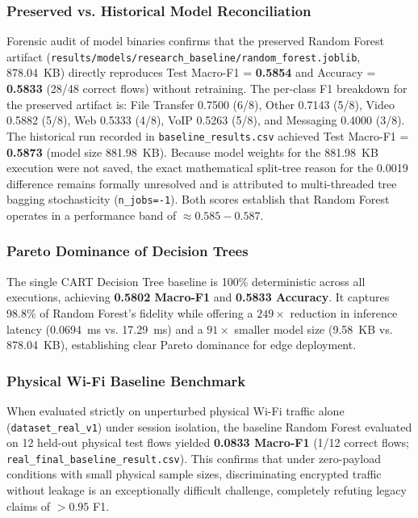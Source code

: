 \documentclass[conference]{IEEEtran}
\begin{document}
\subsubsection{Preserved vs. Historical Model Reconciliation}
Forensic audit of model binaries confirms that the preserved Random Forest artifact (\texttt{results/models/research\_baseline/random\_forest.joblib}, 878.04~KB) directly reproduces Test Macro-F1 = \textbf{0.5854} and Accuracy = \textbf{0.5833} (28/48 correct flows) without retraining. The per-class F1 breakdown for the preserved artifact is: File Transfer 0.7500 (6/8), Other 0.7143 (5/8), Video 0.5882 (5/8), Web 0.5333 (4/8), VoIP 0.5263 (5/8), and Messaging 0.4000 (3/8). The historical run recorded in \texttt{baseline\_results.csv} achieved Test Macro-F1 = \textbf{0.5873} (model size 881.98~KB). Because model weights for the 881.98~KB execution were not saved, the exact mathematical split-tree reason for the 0.0019 difference remains formally unresolved and is attributed to multi-threaded tree bagging stochasticity (\texttt{n\_jobs=-1}). Both scores establish that Random Forest operates in a performance band of $\approx 0.585 - 0.587$.

\subsubsection{Pareto Dominance of Decision Trees}
The single CART Decision Tree baseline is 100\% deterministic across all executions, achieving \textbf{0.5802 Macro-F1} and \textbf{0.5833 Accuracy}. It captures 98.8\% of Random Forest's fidelity while offering a $249\times$ reduction in inference latency (0.0694~ms vs. 17.29~ms) and a $91\times$ smaller model size (9.58~KB vs. 878.04~KB), establishing clear Pareto dominance for edge deployment.

\subsubsection{Physical Wi-Fi Baseline Benchmark}
When evaluated strictly on unperturbed physical Wi-Fi traffic alone (\texttt{dataset\_real\_v1}) under session isolation, the baseline Random Forest evaluated on 12 held-out physical test flows yielded \textbf{0.0833 Macro-F1} (1/12 correct flows; \texttt{real\_final\_baseline\_result.csv}). This confirms that under zero-payload conditions with small physical sample sizes, discriminating encrypted traffic without leakage is an exceptionally difficult challenge, completely refuting legacy claims of $>0.95$ F1.
\end{document}
